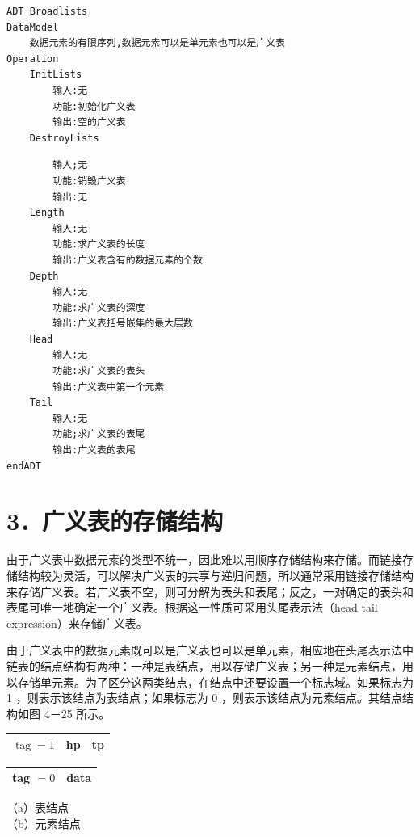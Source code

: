 \documentclass[10pt]{article}
\begin{document}
\begin{verbatim}
ADT Broadlists
DataModel
    数据元素的有限序列,数据元素可以是单元素也可以是广义表
Operation
    InitLists
        输人:无
        功能:初始化广义表
        输出:空的广义表
    DestroyLists
\end{verbatim}

\begin{verbatim}
        输人;无
        功能:销毁广义表
        输出:无
    Length
        输人:无
        功能:求广义表的长度
        输出:广义表含有的数据元素的个数
    Depth
        输人:无
        功能:求广义表的深度
        输出:广义表括号嵌集的最大层数
    Head
        输人:无
        功能:求广义表的表头
        输出:广义表中第一个元素
    Tail
        输人:无
        功能;求广义表的表尾
        输出:广义表的表尾
endADT
\end{verbatim}

\section*{3．广义表的存储结构}
由于广义表中数据元素的类型不统一，因此难以用顺序存储结构来存储。而链接存储结构较为灵活，可以解决广义表的共享与递归问题，所以通常采用链接存储结构来存储广义表。若广义表不空，则可分解为表头和表尾；反之，一对确定的表头和表尾可唯一地确定一个广义表。根据这一性质可采用头尾表示法（head tail expression）来存储广义表。

由于广义表中的数据元素既可以是广义表也可以是单元素，相应地在头尾表示法中链表的结点结构有两种：一种是表结点，用以存储广义表；另一种是元素结点，用以存储单元素。为了区分这两类结点，在结点中还要设置一个标志域。如果标志为 1 ，则表示该结点为表结点；如果标志为 0 ，则表示该结点为元素结点。其结点结构如图 4－25 所示。

\begin{center}
\begin{tabular}{|l|l|l|}
\hline
$\operatorname{tag}=1$ & hp & tp \\
\hline
\end{tabular}
\end{center}

\begin{center}
\begin{tabular}{|l|l|}
\hline
tag $=0$ & data \\
\hline
\end{tabular}
\end{center}

（a）表结点\\
（b）元素结点
\end{document}
